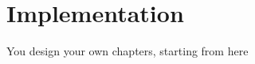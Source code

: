 
\chapter{Implementation}
\label{chap:implementation}
You design your own chapters, starting from here

